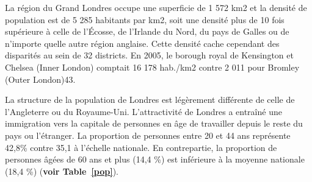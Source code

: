 \documentclass{article}
\begin{document}
La région du Grand Londres occupe une superficie de 1 572 km2 et la densité de population est de 5 285 habitants par km2, soit une densité plus de 10 fois supérieure à celle de l'Écosse, de l'Irlande du Nord, du pays de Galles ou de n'importe quelle autre région anglaise. Cette densité cache cependant des disparités au sein de 32 districts. En 2005, le borough royal de Kensington et Chelsea (Inner London) comptait 16 178 hab./km2 contre 2 011 pour Bromley (Outer London)43.

\begin{table}
\begin{center}
\end{center}
\caption{Relevé météorologique de Londres Kew Gardens (période : 1981-2010)}
\label{pop}
\end{table}


La structure de la population de Londres est légèrement différente de celle de l'Angleterre ou du Royaume-Uni. L'attractivité de Londres a entraîné une immigration vers la capitale de personnes en âge de travailler depuis le reste du pays ou l'étranger. La proportion de personnes entre 20 et 44 ans représente 42,8\% contre 35,1 à l'échelle nationale. En contrepartie, la proportion de personnes âgées de 60 ans et plus (14,4 \%) est inférieure à la moyenne nationale (18,4 \%) (\textbf{voir Table~\ref{pop}}).
\end{document}
